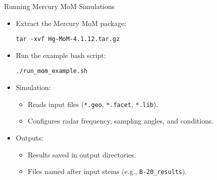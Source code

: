 \begin{frame}{Running Mercury MoM Simulations}
    \begin{itemize}
        \item Extract the Mercury MoM package:
        \begin{tcolorbox}[colback=mygray, colframe=blue!50, sharp corners]
        \texttt{tar -xvf Hg-MoM-4.1.12.tar.gz}
        \end{tcolorbox}

        \item Run the example bash script:
        \begin{tcolorbox}[colback=mygray, colframe=blue!50, sharp corners]
        \texttt{./run\_mom\_example.sh}
        \end{tcolorbox}

        \item Simulation:
            \begin{itemize}
                \item Reads input files (\texttt{*.geo}, \texttt{*.facet}, \texttt{*.lib}).
                \item Configures radar frequency, sampling angles, and conditions.
            \end{itemize}

        \item Outputs:
            \begin{itemize}
                \item Results saved in output directories.
                \item Files named after input stems (e.g., \texttt{B-20\_results}).
            \end{itemize}
    \end{itemize}
\end{frame}

